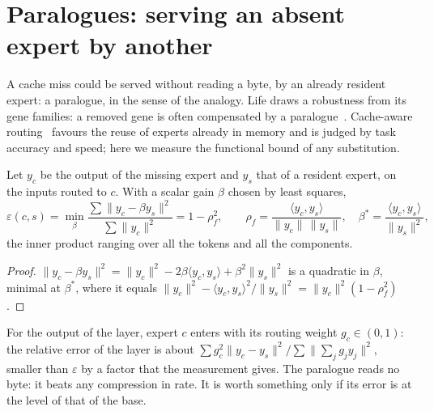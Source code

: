 \section{Paralogues: serving an absent expert by another}\label{t3dup:sec:paralogues}

A cache miss could be served without reading a byte, by an already resident expert: a paralogue, in the sense of the analogy. Life draws a robustness from its gene families: a removed gene is often compensated by a paralogue~\cite{gu2003duplicate}. Cache-aware routing~\cite{skliar2024cacheconditional} favours the reuse of experts already in memory and is judged by task accuracy and speed; here we measure the functional bound of any substitution.

\begin{lemme}\label{t3dup:lem:paralogue}
Let $y_c$ be the output of the missing expert and $y_s$ that of a resident expert, on the inputs routed to $c$. With a scalar gain $\beta$ chosen by least squares,
\begin{equation}\label{t3dup:eq:paralogue}
\varepsilon(c, s) = \min_\beta \frac{\sum\|y_c - \beta y_s\|^2}{\sum\|y_c\|^2} = 1 - \rho_f^2, \qquad \rho_f = \frac{\langle y_c, y_s\rangle}{\|y_c\|\,\|y_s\|},\quad \beta^\ast = \frac{\langle y_c, y_s\rangle}{\|y_s\|^2},
\end{equation}
the inner product ranging over all the tokens and all the components.
\end{lemme}

\begin{proof}
$\|y_c - \beta y_s\|^2 = \|y_c\|^2 - 2\beta\langle y_c, y_s\rangle + \beta^2\|y_s\|^2$ is a quadratic in $\beta$, minimal at $\beta^\ast$, where it equals $\|y_c\|^2 - \langle y_c, y_s\rangle^2/\|y_s\|^2 = \|y_c\|^2(1 - \rho_f^2)$.
\end{proof}

For the output of the layer, expert $c$ enters with its routing weight $g_c \in (0, 1)$: the relative error of the layer is about $\sum g_c^2\|y_c - y_s\|^2 / \sum\|\sum_j g_j y_j\|^2$, smaller than $\varepsilon$ by a factor that the measurement gives. The paralogue reads no byte: it beats any compression in rate. It is worth something only if its error is at the level of that of the base.

